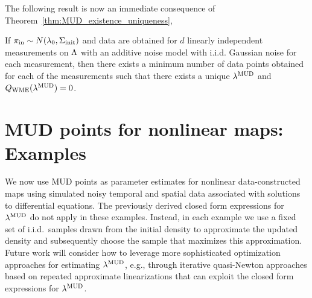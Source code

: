 The following result is now an immediate consequence of Theorem~\ref{thm:MUD_existence_uniqueness},

\begin{corollary}\label{cor:MUD_wme}
If $\operatorname*{\pi_{in}} \sim N(\lambda_0,\Sigma_\text{init})$ and data are obtained for $d$ linearly independent measurements on ${\Lambda}$ with an additive noise model with i.i.d. Gaussian noise for each measurement, then there exists a minimum number of data points obtained for each of the measurements such that there exists a unique $\lambda^{\text{MUD}}$ and $Q_\text{WME}(\lambda^{\text{MUD}}) = 0$.
\end{corollary}



\section{MUD points for nonlinear maps: Examples}\label{sec:Parameter-identification}

We now use MUD points as parameter estimates for nonlinear data-constructed maps using simulated noisy temporal and spatial data associated with solutions to differential equations.
The previously derived closed form expressions for $\lambda^{\text{MUD}}$ do not apply in these examples.
Instead, in each example we use a fixed set of i.i.d.~samples drawn from the initial density to approximate the updated density and subsequently choose the sample that maximizes this approximation.
Future work will consider how to leverage more sophisticated optimization approaches for estimating $\lambda^{\text{MUD}}$, e.g., through iterative quasi-Newton approaches based on repeated approximate linearizations that can exploit the closed form expressions for $\lambda^{\text{MUD}}$.

